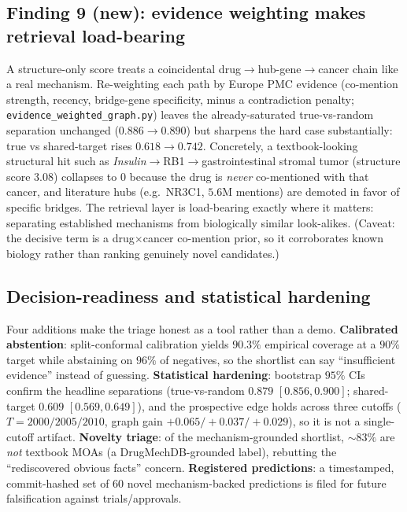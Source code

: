 \documentclass[11pt]{article}
\begin{document}
\subsection{Finding 9 (new): evidence weighting makes retrieval load-bearing}
A structure-only score treats a coincidental drug$\to$hub-gene$\to$cancer chain like a real
mechanism. Re-weighting each path by Europe PMC evidence (co-mention strength, recency,
bridge-gene specificity, minus a contradiction penalty;
\texttt{evidence\_weighted\_graph.py}) leaves the already-saturated true-vs-random
separation unchanged ($0.886\!\to\!0.890$) but sharpens the hard case substantially:
true vs shared-target rises $\mathbf{0.618\!\to\!0.742}$. Concretely, a textbook-looking
structural hit such as \emph{Insulin}$\to$RB1$\to$gastrointestinal stromal tumor (structure
score $3.08$) collapses to $0$ because the drug is \emph{never} co-mentioned with that cancer,
and literature hubs (e.g.\ NR3C1, $5.6$M mentions) are demoted in favor of specific bridges.
The retrieval layer is load-bearing exactly where it matters: separating established
mechanisms from biologically similar look-alikes. (Caveat: the decisive term is a
drug$\times$cancer co-mention prior, so it corroborates known biology rather than ranking
genuinely novel candidates.)

\subsection{Decision-readiness and statistical hardening}
Four additions make the triage honest as a tool rather than a demo. \textbf{Calibrated
abstention}: split-conformal calibration yields $90.3\%$ empirical coverage at a $90\%$
target while abstaining on $96\%$ of negatives, so the shortlist can say ``insufficient
evidence'' instead of guessing. \textbf{Statistical hardening}: bootstrap $95\%$ CIs confirm
the headline separations (true-vs-random $0.879$ $[0.856,0.900]$; shared-target $0.609$
$[0.569,0.649]$), and the prospective edge holds across three cutoffs
($T{=}2000/2005/2010$, graph gain $+0.065/+0.037/+0.029$), so it is not a single-cutoff
artifact. \textbf{Novelty triage}: of the mechanism-grounded shortlist, $\sim$$83\%$ are
\emph{not} textbook MOAs (a DrugMechDB-grounded label), rebutting the ``rediscovered obvious
facts'' concern. \textbf{Registered predictions}: a timestamped, commit-hashed set of $60$
novel mechanism-backed predictions is filed for future falsification against trials/approvals.
\end{document}
